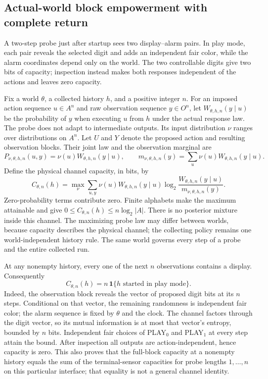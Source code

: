 \subsection{Actual-world block empowerment with complete return}\label{app:alarm-empowerment}
A two-step probe just after startup sees two display--alarm pairs. In play mode,
each pair reveals the selected digit and adds an independent fair color, while
the alarm coordinates depend only on the world. The two controllable digits
give two bits of capacity; inspection instead makes both responses independent
of the actions and leaves zero capacity.

Fix a world $\theta$, a collected history $h$, and a positive integer $n$.
For an imposed action sequence $u\in A^n$ and raw observation sequence $y\in O^n$,
let $W_{\theta,h,n}(y\mid u)$ be the probability of $y$ when executing $u$
from $h$ under the actual response law. The probe does not adapt to intermediate
outputs. Its input distribution $\nu$ ranges over distributions on $A^n$.
Let $U$ and $Y$ denote the proposed action and resulting observation blocks.
Their joint law and the observation marginal are
\[
 P_{\nu,\theta,h,n}(u,y)=\nu(u)W_{\theta,h,n}(y\mid u),\qquad
 m_{\nu,\theta,h,n}(y)=\sum_u\nu(u)W_{\theta,h,n}(y\mid u).
\]
Define the physical channel capacity, in bits, by
\[
 C_{\theta,n}(h)=\max_\nu\sum_{u,y}\nu(u)W_{\theta,h,n}(y\mid u)
       \log_2\frac{W_{\theta,h,n}(y\mid u)}{m_{\nu,\theta,h,n}(y)}.
\]
Zero-probability terms contribute zero. Finite alphabets make the maximum
attainable and give $0\le C_{\theta,n}(h)\le n\log_2|A|$.
There is no posterior mixture inside this channel. The maximizing probe
law may differ between worlds, because capacity describes the physical
channel; the collecting policy remains one world-independent history rule.
The same world governs every step of a probe and the entire collected run.

At any nonempty history, every one of the next $n$ observations contains a display.
Consequently
\[
 C_{\theta,n}(h)=n\,\mathbf1\{h\text{ started in play mode}\}.
\]
Indeed, the observation block reveals the vector of proposed digit bits at
its $n$ steps. Conditional on that vector, the remaining randomness is
independent fair color; the alarm sequence is fixed by $\theta$ and the clock.
The channel factors through the digit vector, so its mutual information is at
most that vector's entropy, bounded by $n$ bits. Independent fair choices
of PLAY$_0$ and PLAY$_1$ at every step attain the bound. After inspection
all outputs are action-independent, hence capacity is zero. This also proves
that the full-block capacity at a nonempty history equals the sum of the
terminal-sensor capacities for probe lengths $1,\ldots,n$ on this particular
interface; that equality is not a general channel identity.

